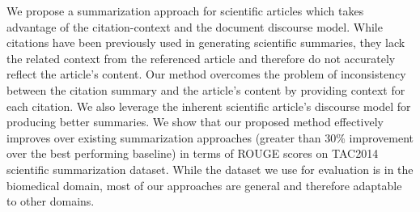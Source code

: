 We propose a summarization approach for scientific articles which takes advantage of the citation-context and the document discourse model. While citations have been previously used in generating scientific summaries, they lack the related context from the referenced article and therefore do not accurately reflect the article's content. Our method overcomes the problem of inconsistency between the citation summary and the article's content by providing context for each citation. We also leverage the inherent scientific article's discourse model for producing better summaries. We show that our proposed method effectively improves over existing summarization approaches (greater than 30\% improvement over the best performing baseline) in terms of ROUGE scores on TAC2014 scientific summarization dataset. While the dataset we use for evaluation is in the biomedical domain, most of our approaches are general and therefore adaptable to other domains.
